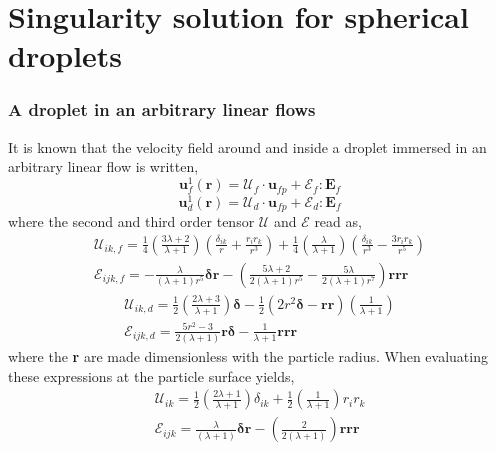\section{Singularity solution for spherical droplets}

\subsubsection*{A droplet in an arbitrary linear flows}

It is known that the velocity field around and inside a droplet immersed in an arbitrary linear flow is written,
\begin{equation}
    \textbf{u}_f^1(\textbf{r})
    = 
    \mathcal{U}_f\cdot \textbf{u}_{fp}
    + \mathcal{E}_f: \textbf{E}_{f}
\end{equation}
\begin{equation}
    \textbf{u}_d^1(\textbf{r})
    = 
    \mathcal{U}_d\cdot \textbf{u}_{fp}
    + \mathcal{E}_d: \textbf{E}_{f}
\end{equation}
where the second and third order tensor $\mathcal{U}$ and $\mathcal{E}$ read as, 
\begin{align}
    \mathcal{U}_{ik,f} = 
    \frac{1}{4}\left(\frac{3\lambda + 2}{\lambda +1}\right)
    \left(\frac{\delta_{ik}}{r} + \frac{r_ir_k}{r^3}\right) 
    + 
    \frac{1}{4}\left(\frac{\lambda}{\lambda +1}\right)
    \left(\frac{\delta_{ik}}{r^3} - \frac{3r_ir_k}{r^5}\right)  \\
    \mathcal{E}_{ijk,f}
    =
    -\frac{\lambda}{(\lambda + 1)r^5} \bm\delta\textbf{r}
    -\left(\frac{5\lambda +2}{2(\lambda +1 )r^5} - \frac{5\lambda}{2(\lambda+1)r^7}\right) \textbf{rrr}
\end{align}
\begin{align}
    \mathcal{U}_{ik,d} = 
    \frac{1}{2}\left(\frac{2\lambda +3}{\lambda +1}\right)\bm\delta
    -\frac{1}{2} (2r^2 \bm\delta - \textbf{rr})
    \left(\frac{1}{\lambda +1}\right)\\
    \mathcal{E}_{ijk,d}
    =
    \frac{5r^2 -3}{2(\lambda +1)} \textbf{r}\bm\delta
    - \frac{1}{\lambda+1}\textbf{rrr}
\end{align}
where the \textbf{r} are made dimensionless with the particle radius. 
When evaluating these expressions at the particle surface yields, 
\begin{align}
    \mathcal{U}_{ik} = 
    \frac{1}{2}\left(\frac{2\lambda + 1}{\lambda +1}\right)
    \delta_{ik} 
    + 
    \frac{1}{2}\left(\frac{1}{\lambda +1}\right)
    r_ir_k  \\
    \mathcal{E}_{ijk}
    = 
    \frac{\lambda}{(\lambda + 1)}
    \bm\delta\textbf{r}
    -\left(\frac{2}{2(\lambda +1 )} \right) \textbf{rrr}
\end{align}
